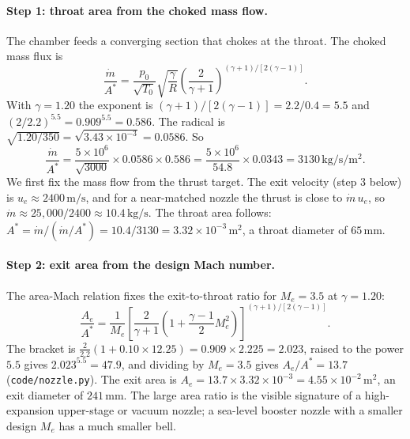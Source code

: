 \paragraph{Step 1: throat area from the choked mass flow.} The chamber
feeds a converging section that chokes at the throat. The choked mass
flux is
\[
\frac{\dot m}{A^*} = \frac{p_0}{\sqrt{T_0}}\sqrt{\frac{\gamma}{R}}
\left(\frac{2}{\gamma + 1}\right)^{(\gamma + 1)/[2(\gamma - 1)]}.
\]
With $\gamma = 1.20$ the exponent is $(\gamma + 1)/[2(\gamma - 1)] =
2.2/0.4 = 5.5$ and $(2/2.2)^{5.5} = 0.909^{5.5} = 0.586$. The radical
is $\sqrt{1.20/350} = \sqrt{3.43\times 10^{-3}} = 0.0586$. So
\[
\frac{\dot m}{A^*} = \frac{5\times 10^{6}}{\sqrt{3000}}\times 0.0586
\times 0.586 = \frac{5\times 10^{6}}{54.8}\times 0.0343
= 3130\,\si{\kilogram\per\second}/\si{\meter}^2.
\]
We first fix the mass flow from the thrust target. The exit velocity
(step 3 below) is $u_e \approx 2400\,\si{\meter\per\second}$, and for a
near-matched nozzle the thrust is close to $\dot m\,u_e$, so
$\dot m \approx 25{,}000/2400 \approx 10.4\,\si{\kilogram\per\second}$.
The throat area follows: $A^* = \dot m/(\dot m/A^*) = 10.4/3130 =
3.32\times 10^{-3}\,\si{\meter}^2$, a throat diameter of
$65\,\si{\milli\meter}$.

\paragraph{Step 2: exit area from the design Mach number.} The
area-Mach relation fixes the exit-to-throat ratio for $M_e = 3.5$ at
$\gamma = 1.20$:
\[
\frac{A_e}{A^*} = \frac{1}{M_e}\left[\frac{2}{\gamma + 1}
\left(1 + \frac{\gamma - 1}{2}M_e^2\right)\right]^{(\gamma + 1)/
[2(\gamma - 1)]}.
\]
The bracket is $\frac{2}{2.2}(1 + 0.10\times 12.25) =
0.909\times 2.225 = 2.023$, raised to the power $5.5$ gives
$2.023^{5.5} = 47.9$, and dividing by $M_e = 3.5$ gives
$A_e/A^* = 13.7$ (\texttt{code/nozzle.py}). The exit area is
$A_e = 13.7\times 3.32\times 10^{-3} = 4.55\times 10^{-2}\,\si{
\meter}^2$, an exit diameter of $241\,\si{\milli\meter}$. The large
area ratio is the visible signature of a high-expansion upper-stage or
vacuum nozzle; a sea-level booster nozzle with a smaller design $M_e$
has a much smaller bell.

